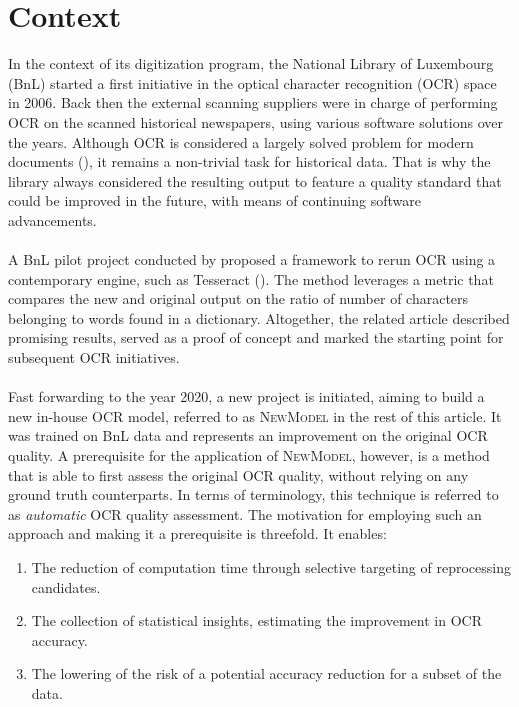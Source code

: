 \documentclass{jdmdh}
\begin{document}
\section{Context}
In the context of its digitization program, the National Library of Luxembourg (BnL) started a first initiative in the optical character recognition (OCR) space in 2006. Back then the external scanning suppliers were in charge of performing OCR on the scanned historical newspapers, using various software solutions over the years. Although OCR is considered a largely solved problem for modern documents (\citet{doermann}), it remains a non-trivial task for historical data. That is why the library always considered the resulting output to feature a quality standard that could be improved in the future, with means of continuing software advancements.
\\ \\
A BnL pilot project conducted by \citet{maurer} proposed a framework to rerun OCR using a contemporary engine, such as Tesseract (\citet{kay}). The method leverages a metric that compares the new and original output on the ratio of number of characters belonging to words found in a dictionary. Altogether, the related article described promising results, served as a proof of concept and marked the starting point for subsequent OCR initiatives.
\\ \\
Fast forwarding to the year 2020, a new project is initiated, aiming to build a new in-house OCR model, referred to as \textsc{NewModel} in the rest of this article. It was trained on BnL data and represents an improvement on the original OCR quality. A prerequisite for the application of \textsc{NewModel}, however, is a method that is able to first assess the original OCR quality, without relying on any ground truth counterparts. In terms of terminology, this technique is referred to as \textit{automatic} OCR quality assessment. The motivation for employing such an approach and making it a prerequisite is threefold. It enables: \\
\begin{enumerate}
    \item The reduction of computation time through selective targeting of reprocessing candidates.
    \item The collection of statistical insights, estimating the improvement in OCR accuracy.
    \item The lowering of the risk of a potential accuracy reduction for a subset of the data.
\end{enumerate}
\begin{align}\label{enum:goals}
\end{align}
\end{document}

